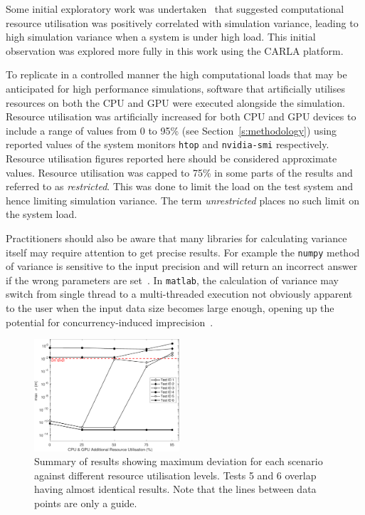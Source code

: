 Some initial exploratory work was undertaken~\cite{TSLUnrealEngineTesting} that suggested computational resource utilisation was positively correlated with simulation variance, leading to high simulation variance when a system is under high load. This initial observation was explored more fully in this work using the CARLA platform. 

To replicate in a controlled manner the high computational loads that may be anticipated for high performance simulations, software that artificially utilises resources on both the CPU and GPU were executed alongside the simulation. Resource utilisation was artificially increased for both CPU and GPU devices to include a range of values from 0 to 95\% (see Section~\ref{s:methodology}) using reported values of the system monitors \texttt{htop} and \texttt{nvidia-smi} respectively. Resource utilisation figures reported here should be considered approximate values. Resource utilisation was capped to 75\% in some parts of the results and referred to as \textit{restricted}. This was done to limit the load on the test system and hence limiting simulation variance. The term \textit{unrestricted} places no such limit on the system load.

Practitioners should also be aware that many libraries for calculating variance itself may require attention to get precise results. For example the \texttt{numpy} method of variance is sensitive to the input precision and will return an incorrect answer if the wrong parameters are set~\cite{NumpyVar}. In \texttt{matlab}, the calculation of variance may switch from single thread to a multi-threaded execution not obviously apparent to the user when the input data size becomes large enough, opening up the potential for concurrency-induced imprecision~\cite{matlab_parallel_computing}. 

\begin{figure}[t]
    \centering
    \includegraphics[width=0.48\textwidth]{../other/figures/ExperimentsStressSummaryV6.pdf}
    \caption{Summary of results showing maximum deviation for each scenario against different resource utilisation levels. Tests 5 and 6 overlap having almost identical results. Note that the lines between data points are only a guide.}
    \label{ExperimentsStressSummary}
\end{figure}
  
